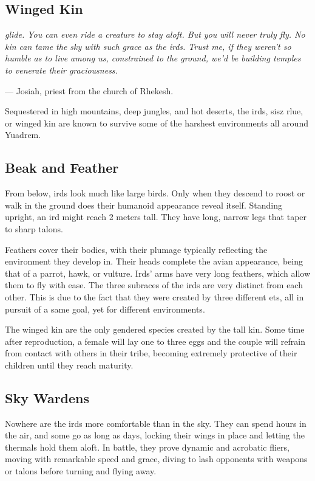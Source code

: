 \begin{linenumbers}

\section{Winged Kin}
\textit{glide.
You can even ride a creature to stay aloft.
But you will never truly fly.
No kin can tame the sky with such grace as the irds.
Trust me, if they weren't so humble as to live among us, constrained to the ground, we'd be building temples to venerate their graciousness.}

\hspace*{\fill} --- Josiah, priest from the church of Rhekesh.

Sequestered in high mountains, deep jungles, and hot deserts, the irds, sisz rlue, or winged kin are known to survive some of the harshest environments all around Yuadrem.

\subsection*{Beak and Feather}
From below, irds look much like large birds.
Only when they descend to roost or walk in the ground does their humanoid appearance reveal itself.
Standing upright, an ird might reach 2 meters tall.
They have long, narrow legs that taper to sharp talons.

Feathers cover their bodies, with their plumage typically reflecting the environment they develop in.
Their heads complete the avian appearance, being that of a parrot, hawk, or vulture.
Irds' arms have very long feathers, which allow them to fly with ease.
The three subraces of the irds are very distinct from each other.
This is due to the fact that they were created by three different ets, all in pursuit of a same goal, yet for different environments.

The winged kin are the only gendered species created by the tall kin.
Some time after reproduction, a female will lay one to three eggs and the couple will refrain from contact with others in their tribe, becoming extremely protective of their children until they reach maturity.

\subsection*{Sky Wardens}
Nowhere are the irds more comfortable than in the sky.
They can spend hours in the air, and some go as long as days, locking their wings in place and letting the thermals hold them aloft.
In battle, they prove dynamic and acrobatic fliers, moving with remarkable speed and grace, diving to lash opponents with weapons or talons before turning and flying away.


\end{linenumbers}
